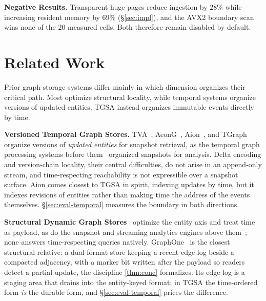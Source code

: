 \documentclass[sigconf,nonacm]{acmart}
\newcommand{\sys}{TGSA\xspace}
\begin{document}
\textbf{Negative Results.} Transparent huge pages reduce ingestion by $28\%$ while increasing
resident memory by $69\%$ (\S\ref{sec:impl}), and the AVX2 boundary
scan wins none of the 20 measured cells. Both therefore remain
disabled by default.

\section{Related Work}\label{sec:related}
Prior graph-storage systems differ mainly in which dimension organizes
their critical path. Most optimize structural locality, while temporal
systems organize versions of updated entities. \sys instead organizes
immutable events directly by time.

\textbf{Versioned Temporal Graph Stores.} TVA~\cite{li2026tva},
AeonG~\cite{hou2024aeong}, Aion~\cite{theodorakis2024aion}, and
TGraph~\cite{huang2016tgraph} organize versions of \emph{updated
entities} for snapshot retrieval, as the temporal graph processing
systems before them~\cite{cheng2012kineograph, han2014chronos,
miao2015immortalgraph, iyer2021tegra} organized snapshots for analysis.
Delta encoding and version-chain locality, their central difficulties,
do not arise in an append-only stream, and time-respecting
reachability is not expressible over a snapshot surface. Aion comes
closest to \sys in spirit, indexing updates by time, but it indexes
revisions of entities rather than making time the address of the
events themselves. \S\ref{sec:eval-temporal} measures the boundary in
both directions.

\textbf{Structural Dynamic Graph Stores}~\cite{wheatman2021ppcsr,
shen2026dcsr, dhulipala2019aspen, fuchs2023sortledton,
pandey2021terrace, deleo2021teseo, zhu2020livegraph, ediger2012stinger}
optimize the entity axis and treat time as payload, as do the
snapshot and streaming analytics engines above
them~\cite{macko2015llama, hao2025rapidstore, shi2016tornado,
mariappan2019graphbolt}; none answers time-respecting queries
natively. GraphOne~\cite{kumar2019graphone} is the closest
structural relative: a dual-format store keeping a recent edge log
beside a compacted adjacency, with a marker bit written after the
payload so readers detect a partial update, the discipline
\cref{thm:conc} formalizes. Its edge log is a staging area that drains
into the entity-keyed format; in \sys the time-ordered form \emph{is}
the durable form, and \S\ref{sec:eval-temporal} prices the difference.
\end{document}
